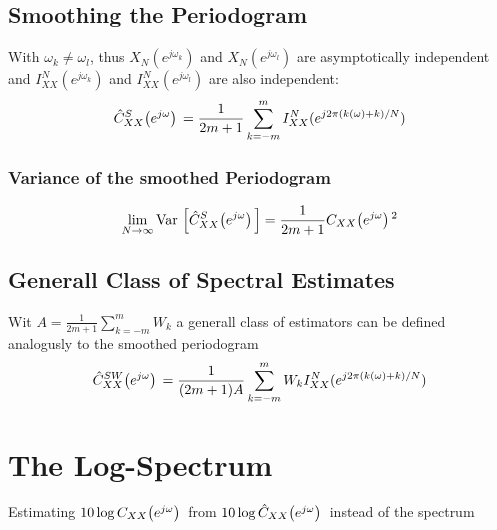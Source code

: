 \documentclass[accentcolor=tud4c,9.5pt,nochapname,bigchapter,paper=a5report]{tudreport}
\begin{document}
\subsection{Smoothing the Periodogram}
With $\omega_k\neq\omega_l$, thus $X_N(e^{j\omega_k})$ and $X_N(e^{j\omega_l})$ are asymptotically independent and 
$I_{XX}^N(e^{j\omega_k})$ and $I_{XX}^N(e^{j\omega_l})$ are also independent:
\begin{equation}
\hat{C}_{XX}^S{\left(e^{j\omega}\right)}\, = \frac{1}{2m+1}\sum\limits_{k=-m}^m I_{XX}^N(e^{j2\pi(k(\omega)+k)/N})
\end{equation}
\subsubsection{Variance of the smoothed Periodogram}
\begin{equation}
\lim\limits_{N\rightarrow\infty} {\rm Var}\,\left[\hat{C}_{XX}^S{\left(e^{j\omega}\right)}\,\right] = \frac{1}{2m+1} C_{XX}{\left(e^{j\omega}\right)}\,^2
\end{equation}


\subsection{Generall Class of Spectral Estimates}
Wit $A=\frac{1}{2m+1}\sum_{k=-m}^m W_k$ a generall class of estimators can be defined analogusly to the smoothed periodogram
\begin{equation}
\hat{C}_{XX}^{SW}{\left(e^{j\omega}\right)}\, = \frac{1}{(2m+1)A}\sum\limits_{k=-m}^m W_kI_{XX}^N(e^{j2\pi(k(\omega)+k)/N})
\end{equation}

\section{The Log-Spectrum}
Estimating $10\log C_{XX}{\left(e^{j\omega}\right)}\,$ from $10\log \hat{C}_{XX}{\left(e^{j\omega}\right)}\,$ instead of the spectrum
\end{document}
